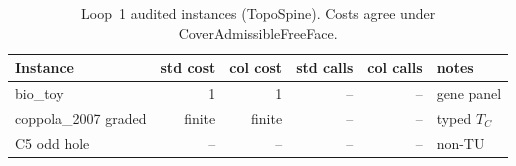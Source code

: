 \begin{table}[h]
\centering
\caption{Loop~1 audited instances (TopoSpine). Costs agree under CoverAdmissibleFreeFace.}
\label{tab:bench}
\begin{tabular}{lrrrrl}
\hline
Instance & std cost & col cost & std calls & col calls & notes \\
\hline
bio\_toy & 1 & 1 & -- & -- & gene panel \\
coppola\_2007 graded & finite & finite & -- & -- & typed $T_C$ \\
C5 odd hole & -- & -- & -- & -- & non-TU \\
\hline
\end{tabular}
\end{table}
